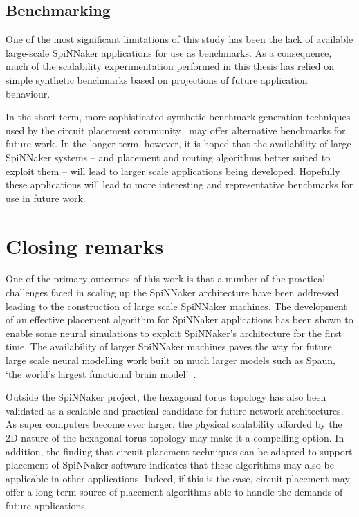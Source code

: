 		\subsection{Benchmarking}
			
			One of the most significant limitations of this study has been the lack
			of available large-scale SpiNNaker applications for use as benchmarks. As
			a consequence, much of the scalability experimentation performed in this
			thesis has relied on simple synthetic benchmarks based on projections of
			future application behaviour.
			
			In the short term, more sophisticated synthetic benchmark generation
			techniques used by the circuit placement community~\cite{nam07} may offer
			alternative benchmarks for future work. In the longer term, however, it
			is hoped that the availability of large SpiNNaker systems -- and
			placement and routing algorithms better suited to exploit them -- will
			lead to larger scale applications being developed. Hopefully these
			applications will lead to more interesting and representative benchmarks
			for use in future work.
	
	\section{Closing remarks}
		
		One of the primary outcomes of this work is that a number of the practical
		challenges faced in scaling up the SpiNNaker architecture have been
		addressed leading to the construction of large scale SpiNNaker machines.
		The development of an effective placement algorithm for SpiNNaker
		applications has been shown to enable some neural simulations to exploit
		SpiNNaker's architecture for the first time. The availability of larger
		SpiNNaker machines paves the way for future large scale neural modelling
		work built on much larger models such as Spaun, `the world's largest
		functional brain model'~\cite{eliasmith12}.
		
		Outside the SpiNNaker project, the hexagonal torus topology has also been
		validated as a scalable and practical candidate for future network
		architectures. As super computers become ever larger, the physical
		scalability afforded by the 2D nature of the hexagonal torus topology may
		make it a compelling option. In addition, the finding that circuit
		placement techniques can be adapted to support placement of SpiNNaker
		software indicates that these algorithms may also be applicable in other
		applications. Indeed, if this is the case, circuit placement may offer a
		long-term source of placement algorithms able to handle the demands of
		future applications.
		
